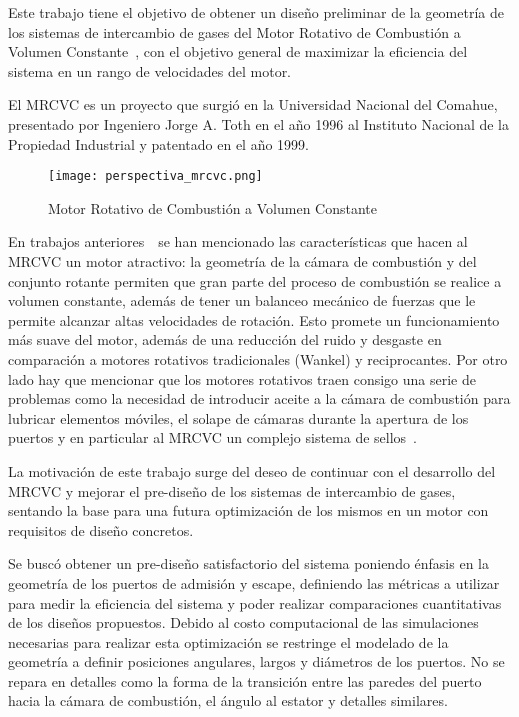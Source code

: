 Este trabajo tiene el objetivo de obtener un diseño preliminar de la geometría
de los sistemas de intercambio de gases del Motor Rotativo de Combustión a
Volumen Constante~\parencite{toth}, con el objetivo general de maximizar la
eficiencia del sistema en un rango de velocidades del motor.
%

El MRCVC es un proyecto que surgió en la Universidad Nacional del Comahue,
presentado por Ingeniero Jorge A. Toth en el año 1996 al Instituto Nacional de
la Propiedad Industrial y patentado en el año 1999.

\begin{figure}
    \centering
    \texttt{[image: perspectiva\_mrcvc.png]}
    \caption{Motor Rotativo de Combustión a Volumen Constante}\label{fig:mrcvc}
\end{figure}

En trabajos anteriores~\parencite{lopez16,lopez13}~se han mencionado
las características que hacen al MRCVC un motor atractivo: la geometría de la
cámara de combustión y del conjunto rotante permiten que gran parte del proceso
de combustión se realice a volumen constante, además de tener un balanceo
mecánico de fuerzas que le permite alcanzar altas velocidades de rotación.
%
Esto promete un funcionamiento más suave del motor, además de una reducción del
ruido y desgaste en comparación a motores rotativos tradicionales (Wankel) y
reciprocantes.
%
Por otro lado hay que mencionar que los motores rotativos traen consigo una
serie de problemas como la necesidad de introducir aceite a la cámara de
combustión para lubricar elementos móviles, el solape de cámaras durante la
apertura de los puertos y en particular al MRCVC un complejo sistema de
sellos~\parencite{roldan}.


La motivación de este trabajo surge del deseo de continuar con el desarrollo del
MRCVC y mejorar el pre-diseño de los sistemas de intercambio de gases, sentando
la base para una futura optimización de los mismos en un motor con requisitos de
diseño concretos.


Se buscó obtener un pre-diseño satisfactorio del sistema poniendo énfasis en la
geometría de los puertos de admisión y escape, definiendo las métricas a
utilizar para medir la eficiencia del sistema y poder realizar comparaciones
cuantitativas de los diseños propuestos.
%
%
Debido al costo computacional de las simulaciones necesarias para realizar esta
optimización se restringe el modelado de la geometría a definir posiciones
angulares, largos y diámetros de los puertos.
%
No se repara en detalles como la forma de la transición entre las paredes del
puerto hacia la cámara de combustión, el ángulo al estator y detalles similares.

